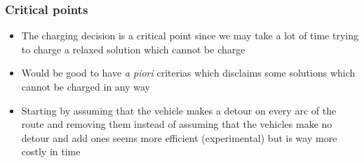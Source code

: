 \documentclass{beamer}
\begin{document}
\begin{frame}
    \frametitle{Critical points}
    \begin{itemize}
        \item The charging decision is a critical point since we may take a lot of time trying to charge a relaxed solution which cannot be charge
        \item Would be good to have \textit{a piori} criterias which disclaims some solutions which cannot be charged in any way
        \item Starting by assuming that the vehicle makes a detour on every arc of the route and removing them instead of assuming that the vehicles make no detour and add ones seems more efficient (experimental) but is way more costly in time
    \end{itemize}
\end{frame}
\end{document}
